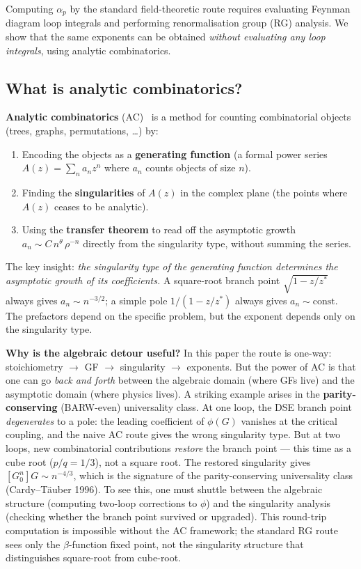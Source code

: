 \documentclass[11pt,a4paper]{article}
\theoremstyle{definition}
\begin{document}
Computing $\alpha_p$ by the standard field-theoretic route requires
evaluating Feynman diagram loop integrals and performing renormalisation
group (RG) analysis. We show that the same exponents can be obtained
\emph{without evaluating any loop integrals}, using analytic combinatorics.

\subsection{What is analytic combinatorics?}

\textbf{Analytic combinatorics} (AC)~\cite{flajolet2009} is a method for
counting combinatorial objects (trees, graphs, permutations, \ldots) by:
\begin{enumerate}[leftmargin=2em]
\item Encoding the objects as a \textbf{generating function} (a formal
      power series $A(z) = \sum_n a_n z^n$ where $a_n$ counts objects of
      size $n$).
\item Finding the \textbf{singularities} of $A(z)$ in the complex plane
      (the points where $A(z)$ ceases to be analytic).
\item Using the \textbf{transfer theorem} to read off the asymptotic
      growth $a_n \sim C\, n^\theta\, \rho^{-n}$ directly from the
      singularity type, without summing the series.
\end{enumerate}
The key insight: \emph{the singularity type of the generating function
determines the asymptotic growth of its coefficients.} A square-root
branch point $\sqrt{1 - z/z^*}$ always gives $a_n \sim n^{-3/2}$; a
simple pole $1/(1 - z/z^*)$ always gives $a_n \sim \mathrm{const}$.
The prefactors depend on the specific problem, but the exponent depends
only on the singularity type.

\textbf{Why is the algebraic detour useful?} In this paper the route is
one-way: stoichiometry $\to$ GF $\to$ singularity $\to$ exponents. But the
power of AC is that one can go \emph{back and forth} between the algebraic
domain (where GFs live) and the asymptotic domain (where physics lives).
A striking example arises in the \textbf{parity-conserving} (BARW-even)
universality class. At one loop, the DSE branch point \emph{degenerates}
to a pole: the leading coefficient of $\phi(G)$ vanishes at the critical
coupling, and the naive AC route gives the wrong singularity type. But at
two loops, new combinatorial contributions \emph{restore} the branch point
--- this time as a cube root ($p/q = 1/3$), not a square root. The restored
singularity gives $[G_0^n]G \sim n^{-4/3}$, which is the signature of the
parity-conserving universality class (Cardy--T\"auber 1996). To see this,
one must shuttle between the algebraic structure (computing two-loop
corrections to $\phi$) and the singularity analysis (checking whether the
branch point survived or upgraded). This round-trip computation is impossible
without the AC framework; the standard RG route sees only the $\beta$-function
fixed point, not the singularity structure that distinguishes square-root
from cube-root.
\end{document}
